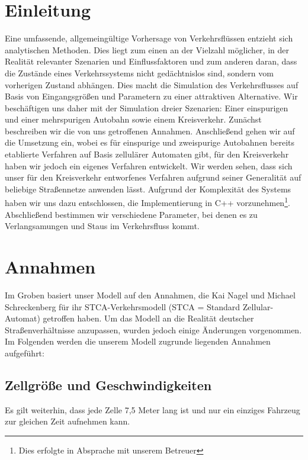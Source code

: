 \documentclass[10pt, a4paper]{article}
\begin{document}
\section{Einleitung}
\label{sec:einleitung}
Eine umfassende, allgemeingültige Vorhersage von Verkehrsflüssen entzieht sich analytischen Methoden. Dies liegt zum einen an der Vielzahl möglicher, in der Realität relevanter Szenarien und Einflussfaktoren und zum anderen daran, dass die Zustände eines Verkehrssystems nicht gedächtnislos sind, sondern vom vorherigen Zustand abhängen. Dies macht die Simulation des Verkehrsflusses auf Basis von Eingangsgrößen und Parametern zu einer attraktiven Alternative. Wir beschäftigen uns daher mit der Simulation dreier Szenarien: Einer einspurigen und einer mehrspurigen Autobahn sowie einem Kreisverkehr. Zunächst beschreiben wir die von uns getroffenen Annahmen. Anschließend gehen wir auf die Umsetzung ein, wobei es für einspurige und zweispurige Autobahnen bereits etablierte Verfahren auf Basis zellulärer Automaten gibt, für den Kreisverkehr haben wir jedoch ein eigenes Verfahren entwickelt. Wir werden sehen, dass sich unser für den Kreisverkehr entworfenes Verfahren aufgrund seiner Generalität auf beliebige Straßennetze anwenden lässt. Aufgrund der Komplexität des Systems haben wir uns dazu entschlossen, die Implementierung in C++ vorzunehmen\footnote{Dies erfolgte in Absprache mit unserem Betreuer}. Abschließend bestimmen wir verschiedene Parameter, bei denen es zu Verlangsamungen und Staus im Verkehrsfluss kommt.

\section{Annahmen}
\label{sec:annahmen}

Im Groben basiert unser Modell auf den Annahmen, die Kai Nagel und Michael Schreckenberg \cite{nagel-schreckenberg} für ihr STCA-Verkehrsmodell (STCA = Standard Zellular-Automat) getroffen haben. Um das Modell an die Realität deutscher Straßenverhältnisse anzupassen, wurden jedoch einige Änderungen vorgenommen.
Im Folgenden werden die unserem Modell zugrunde liegenden Annahmen aufgeführt:%

\subsection{Zellgröße und Geschwindigkeiten}

Es gilt weiterhin, dass jede Zelle 7,5 Meter lang ist und nur ein einziges Fahrzeug zur gleichen Zeit aufnehmen kann.
\end{document}
